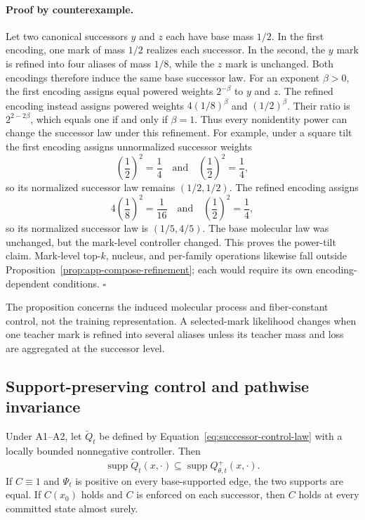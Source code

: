 \paragraph{Proof by counterexample.}
Let two canonical successors $y$ and $z$ each have base mass $1/2$.  In the
first encoding, one mark of mass $1/2$ realizes each successor.  In the second,
the $y$ mark is refined into four aliases of mass $1/8$, while the $z$ mark is
unchanged.  Both encodings therefore induce the same base successor law.
For an exponent $\beta>0$, the first encoding assigns equal powered weights
$2^{-\beta}$ to $y$ and $z$.  The refined encoding instead assigns powered
weights $4(1/8)^\beta$ and $(1/2)^\beta$.  Their ratio is
$2^{2-2\beta}$, which equals one if and only if $\beta=1$.  Thus every
nonidentity power can change the successor law under this refinement.  For
example, under a square tilt the first encoding assigns unnormalized
successor weights
\[
  \left(\frac12\right)^2=\frac14
  \quad\text{and}\quad
  \left(\frac12\right)^2=\frac14,
\]
so its normalized successor law remains $(1/2,1/2)$.  The refined encoding
assigns
\[
  4\left(\frac18\right)^2=\frac1{16}
  \quad\text{and}\quad
  \left(\frac12\right)^2=\frac14,
\]
so its normalized successor law is $(1/5,4/5)$.  The base molecular law was
unchanged, but the mark-level controller changed.  This proves the power-tilt
claim.  Mark-level top-$k$, nucleus, and per-family operations likewise fall
outside Proposition~\ref{prop:app-compose-refinement}; each would require its
own encoding-dependent conditions.
\hfill$\square$

The proposition concerns the induced molecular process and fiber-constant
control, not the training representation. A selected-mark likelihood changes
when one teacher mark is refined into several aliases unless its teacher mass
and loss are aggregated at the successor level.

\subsection{Support-preserving control and pathwise invariance}
\label{sec:app-compose-support-control-proof}

\begin{composeappendixproposition}
\label{prop:app-compose-support-control}
Under A1--A2, let $\widetilde Q_t$ be defined by
Equation~\eqref{eq:successor-control-law} with a locally bounded nonnegative
controller. Then
\[
  \operatorname{supp}\widetilde Q_t(x,\cdot)
  \subseteq
  \operatorname{supp}Q_{\theta,t}^{+}(x,\cdot).
\]
If $C\equiv1$ and $\Psi_t$ is positive on every base-supported edge, the two
supports are equal. If $C(x_0)$ holds and $C$ is enforced on each successor,
then $C$ holds at every committed state almost surely.
\end{composeappendixproposition}

